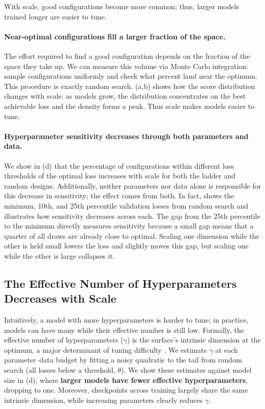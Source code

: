 With scale, good configurations become more common; thus, larger models trained longer are easier to tune.

\paragraph{Near-optimal configurations fill a larger fraction of the space.} The effort required to find a good configuration depends on the fraction of the space they take up. We can measure this volume via Monte Carlo integration: sample configurations uniformly and check what percent land near the optimum. This procedure is exactly random search. (a,b) shows how the score distribution changes with scale: as models grow, the distribution concentrates on the best achievable loss and the density forms a peak. Thus scale makes models easier to tune.


\paragraph{Hyperparameter sensitivity decreases through both parameters and data.} We show in (d) that the percentage of configurations within different loss thresholds of the optimal loss increases with scale for both the ladder and random designs.
Additionally, neither parameters nor data alone is responsible for this decrease in sensitivity; the effect comes from both. In fact,  shows the minimum, 10th, and 25th percentile validation losses from random search and illustrates how sensitivity decreases across each. The gap from the 25th percentile to the minimum directly measures sensitivity because a small gap means that a quarter of all draws are already close to optimal. Scaling one dimension while the other is held small lowers the loss and slightly moves this gap, but scaling one while the other is large collapses it. 

\subsection{The Effective Number of Hyperparameters Decreases with Scale}
\label{sec:understanding-the-hyperparameter-loss-surface-across-scales:the-hyperparameter-loss-surface-becomes-lower-dimensional}


Intuitively, a model with more hyperparameters is harder to tune; in practice, models can have many while their effective number is still low. Formally, the effective number of hyperparameters ($\gamma$) is the surface's intrinsic dimension at the optimum, a major determinant of tuning difficulty \citep{lourie2025hyperparameter}. We estimate $\gamma$ at each parameter--data budget by fitting a noisy quadratic to the tail from random search (all losses below a threshold, $\theta$). We show these estimates against model size in (d), where \textbf{larger models have fewer effective hyperparameters}, dropping to one. Moreover, checkpoints across training largely share the same intrinsic dimension, while increasing parameters clearly reduces $\gamma$. 


